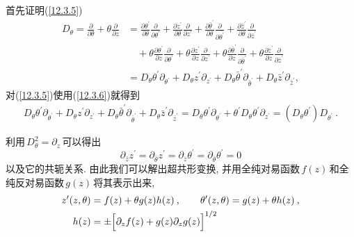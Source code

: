 \begin{tcolorbox}
首先证明(\ref{12.3.5}) 
\begin{align*}
    D_{\theta} = \frac{\partial}{\partial \theta} + \theta \frac{\partial}{\partial z}
    &= \frac{\partial \theta^{\prime}}{\partial \theta} \frac{\partial}{\partial \theta^{\prime}}
    + \frac{\partial z^{\prime}}{\partial \theta} \frac{\partial}{\partial z^{\prime}} 
    +\frac{\partial \bar{\theta}^{\prime}}{\partial \theta} \frac{\partial}{\partial \bar{\theta^{\prime}}}
    + \frac{\partial \bar{z}^{\prime}}{\partial \theta} \frac{\partial}{\partial \bar{z}^{\prime}} \\
    &\quad+ \theta \frac{\partial \theta^{\prime}}{\partial z}\frac{\partial}{\partial \theta^{\prime}}
    +\theta \frac{\partial z^{\prime}}{\partial z}\frac{\partial}{\partial z^{\prime}}
    + \theta \frac{\partial \bar{\theta}^{\prime}}{\partial z}\frac{\partial}{\partial \bar{\theta}^{\prime}}
    +\theta \frac{\partial \bar{z}^{\prime}}{\partial z}\frac{\partial}{\partial \bar{z}^{\prime}} \\
    &=D_{\theta} \theta^{\prime} \partial_{\theta^{\prime}}
    +D_{\theta}z^{\prime}\partial_{z^{\prime}} + D_{\theta}\bar{\theta}^{\prime}\partial_{\bar{\theta}^{\prime}}
    +D_{\theta}\bar{z}^{\prime}\partial_{\bar{z}^{\prime}} ,
\end{align*}
对(\ref{12.3.5})使用(\ref{12.3.6})就得到
\begin{align*}
    D_{\theta} \theta^{\prime} \partial_{\theta^{\prime}}
    +D_{\theta}z^{\prime}\partial_{z^{\prime}} + D_{\theta}\bar{\theta}^{\prime}\partial_{\bar{\theta}^{\prime}}
    +D_{\theta}\bar{z}^{\prime}\partial_{\bar{z}^{\prime}}
    =D_{\theta} \theta^{\prime} \partial_{\theta^{\prime}}
    +\theta^{\prime}D_{\theta}\theta^{\prime}\partial_{z^{\prime}}=(D_{\theta}\theta^{\prime})D_{\theta^{\prime}}\:.
\end{align*}
\end{tcolorbox}
\noindent 利用$\,D_{\theta}^{2}=\partial_{z}\,$可以得出
\begin{equation}
    \partial_{\bar{z}}z^{\prime}=\partial_{\bar{\theta}}z^{\prime}=\partial_{\bar{z}}\theta^{\prime}
    =\partial_{\bar{\theta}}\theta^{\prime} =0  \label{12.3.8}
\end{equation}
以及它的共轭关系. 由此我们可以解出超共形变换, 并用全纯对易函数$\,f(z)\,$和全纯反对易函数$\,g(z)\,$将其表示出来,
\begin{subequations}
\begin{align}
    z^{\prime}(z,\theta) &= f(z)+\theta g(z)h(z) \:, \qquad 
    \theta^{\prime}(z,\theta)=g(z)+\theta h(z) \:, \label{12.3.9a} \\
    h(z) &= \pm\Bigl[\partial_{z}f(z)+g(z)\partial_{z}g(z)\Bigr]^{1/2} \label{12.3.9b}
\end{align} \label{12.3.9}
\end{subequations}
